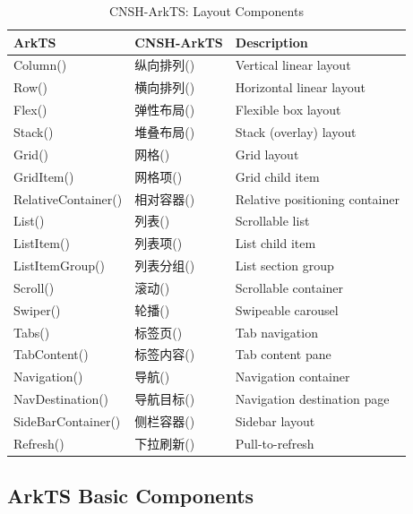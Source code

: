 \begin{table}[h]
\centering
\caption{CNSH-ArkTS: Layout Components}
\renewcommand{\arraystretch}{1.3}
\begin{tabular}{llp{5cm}}
\toprule
\textbf{ArkTS} & \textbf{CNSH-ArkTS} & \textbf{Description} \\
\midrule
Column() & 纵向排列() & Vertical linear layout \\
Row() & 横向排列() & Horizontal linear layout \\
Flex() & 弹性布局() & Flexible box layout \\
Stack() & 堆叠布局() & Stack (overlay) layout \\
Grid() & 网格() & Grid layout \\
GridItem() & 网格项() & Grid child item \\
RelativeContainer() & 相对容器() & Relative positioning container \\
List() & 列表() & Scrollable list \\
ListItem() & 列表项() & List child item \\
ListItemGroup() & 列表分组() & List section group \\
Scroll() & 滚动() & Scrollable container \\
Swiper() & 轮播() & Swipeable carousel \\
Tabs() & 标签页() & Tab navigation \\
TabContent() & 标签内容() & Tab content pane \\
Navigation() & 导航() & Navigation container \\
NavDestination() & 导航目标() & Navigation destination page \\
SideBarContainer() & 侧栏容器() & Sidebar layout \\
Refresh() & 下拉刷新() & Pull-to-refresh \\
\bottomrule
\end{tabular}
\end{table}

\subsection{ArkTS Basic Components}

